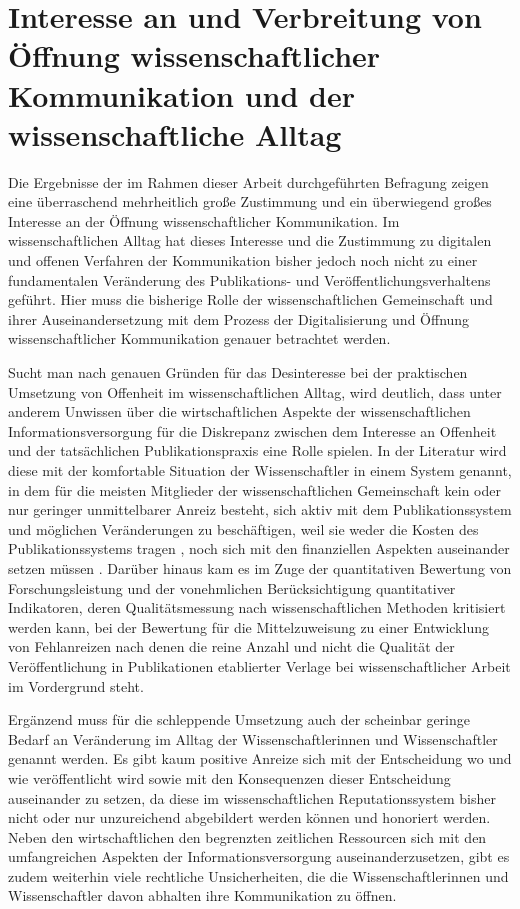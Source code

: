 \section{Interesse an und Verbreitung von Öffnung wissenschaftlicher Kommunikation und der wissenschaftliche Alltag}

Die Ergebnisse der im Rahmen dieser Arbeit durchgeführten Befragung zeigen eine überraschend mehrheitlich große Zustimmung und ein überwiegend großes Interesse an der Öffnung wissenschaftlicher Kommunikation. Im wissenschaftlichen Alltag hat dieses Interesse und die Zustimmung zu digitalen und offenen Verfahren der Kommunikation bisher jedoch noch nicht zu einer fundamentalen Veränderung des Publikations- und Veröffentlichungsverhaltens geführt. Hier muss die bisherige Rolle der wissenschaftlichen Gemeinschaft und ihrer Auseinandersetzung mit dem Prozess der Digitalisierung und Öffnung wissenschaftlicher Kommunikation genauer betrachtet werden.

Sucht man nach genauen Gründen für das Desinteresse bei der praktischen Umsetzung von Offenheit im wissenschaftlichen Alltag, wird deutlich, dass unter anderem Unwissen über die wirtschaftlichen Aspekte der wissenschaftlichen Informationsversorgung für die Diskrepanz zwischen dem Interesse an Offenheit und der tatsächlichen Publikationspraxis eine Rolle spielen. In der Literatur wird diese mit der komfortable Situation der Wissenschaftler in einem System genannt, in dem für die meisten Mitglieder der wissenschaftlichen Gemeinschaft kein oder nur geringer unmittelbarer Anreiz besteht, sich aktiv mit dem Publikationssystem und möglichen Veränderungen zu beschäftigen, weil sie weder die Kosten des Publikationssystems tragen \cite{Sietmann_oa_2007}, noch sich mit den finanziellen Aspekten auseinander setzen müssen \cite{herb_2010}. Darüber hinaus kam es im Zuge der quantitativen Bewertung von Forschungsleistung und der vonehmlichen Berücksichtigung quantitativer Indikatoren, deren Qualitätsmessung nach wissenschaftlichen Methoden kritisiert werden kann, bei der Bewertung für die Mittelzuweisung zu einer Entwicklung von Fehlanreizen nach denen die reine Anzahl und nicht die Qualität der Veröffentlichung in Publikationen etablierter Verlage bei wissenschaftlicher Arbeit im Vordergrund steht.

Ergänzend muss für die schleppende Umsetzung auch der scheinbar geringe Bedarf an Veränderung im Alltag der Wissenschaftlerinnen und Wissenschaftler genannt werden. Es gibt kaum positive Anreize sich mit der Entscheidung wo und wie veröffentlicht wird sowie mit den Konsequenzen dieser Entscheidung auseinander zu setzen, da diese im wissenschaftlichen Reputationssystem bisher nicht oder nur unzureichend abgebildert werden können und honoriert werden. Neben den wirtschaftlichen den begrenzten zeitlichen Ressourcen sich mit den umfangreichen Aspekten der Informationsversorgung auseinanderzusetzen, gibt es zudem weiterhin viele rechtliche Unsicherheiten, die die Wissenschaftlerinnen und Wissenschaftler davon abhalten ihre Kommunikation zu öffnen.

